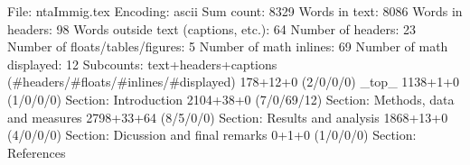 File: ntaImmig.tex
Encoding: ascii
Sum count: 8329
Words in text: 8086
Words in headers: 98
Words outside text (captions, etc.): 64
Number of headers: 23
Number of floats/tables/figures: 5
Number of math inlines: 69
Number of math displayed: 12
Subcounts:
  text+headers+captions (#headers/#floats/#inlines/#displayed)
  178+12+0 (2/0/0/0) _top_
  1138+1+0 (1/0/0/0) Section: Introduction
  2104+38+0 (7/0/69/12) Section: Methods, data and measures 
  2798+33+64 (8/5/0/0) Section: Results and analysis
  1868+13+0 (4/0/0/0) Section: Dicussion and final remarks
  0+1+0 (1/0/0/0) Section: References

